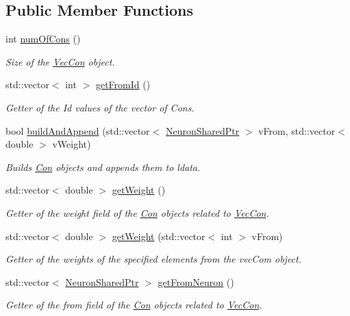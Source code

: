 \subsection*{Public Member Functions}
\begin{DoxyCompactItemize}
\item 
int \hyperlink{classvec_con_a1e39a5e78c40ae8af9bbd2fd7f0dc749}{numOfCons} ()
\begin{DoxyCompactList}\small\item\em Size of the \hyperlink{classvec_con}{VecCon} object. \end{DoxyCompactList}\item 
std::vector$<$ int $>$ \hyperlink{classvec_con_aa9f3f5df4c4060951c975c4c829b8471}{getFromId} ()
\begin{DoxyCompactList}\small\item\em Getter of the Id values of the vector of Cons. \end{DoxyCompactList}\item 
bool \hyperlink{classvec_con_ae2f2979a6ce42fa5ff0a8911a3ec3cb6}{buildAndAppend} (std::vector$<$ \hyperlink{_a_m_o_r_e_8h_a03051950b0faf9499d14cf376e04c329}{NeuronSharedPtr} $>$ vFrom, std::vector$<$ double $>$ vWeight)
\begin{DoxyCompactList}\small\item\em Builds \hyperlink{class_con}{Con} objects and appends them to ldata. \end{DoxyCompactList}\item 
std::vector$<$ double $>$ \hyperlink{classvec_con_a76f10669494f2247d036ae6a1f296873}{getWeight} ()
\begin{DoxyCompactList}\small\item\em Getter of the weight field of the \hyperlink{class_con}{Con} objects related to \hyperlink{classvec_con}{VecCon}. \end{DoxyCompactList}\item 
std::vector$<$ double $>$ \hyperlink{classvec_con_ac3d4b7b11bfff3407afd585c1ae6a658}{getWeight} (std::vector$<$ int $>$ vFrom)
\begin{DoxyCompactList}\small\item\em Getter of the weights of the specified elements from the vecCom object. \end{DoxyCompactList}\item 
std::vector$<$ \hyperlink{_a_m_o_r_e_8h_a03051950b0faf9499d14cf376e04c329}{NeuronSharedPtr} $>$ \hyperlink{classvec_con_ae72d00aedcd054e690f1dcf2ca5ac2c2}{getFromNeuron} ()
\begin{DoxyCompactList}\small\item\em Getter of the from field of the \hyperlink{class_con}{Con} objects related to \hyperlink{classvec_con}{VecCon}. \end{DoxyCompactList}\item 

\end{DoxyCompactItemize}
